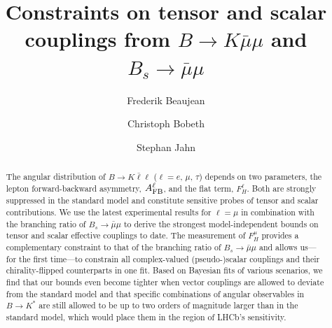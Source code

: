 \documentclass[twocolumn,epjc3]{svjour3}
\numberwithin{equation}{section}
\renewcommand{\[}{\big[}
\renewcommand{\]}{\big]}
\renewcommand{\(}{\big(}
\renewcommand{\)}{\big)}
\begin{document}
\sloppy

\title{Constraints on tensor and scalar couplings from
  $B\to K\bar\mu\mu$ and $B_s\to \bar\mu\mu$
}
\author{Frederik Beaujean
  \and
  Christoph Bobeth
  \and
  Stephan Jahn
}


\maketitle

\begin{abstract}
  The angular distribution of $B\to K\bar\ell\ell$ ($\ell =
  e,\,\mu,\,\tau$) depends on two parameters, the lepton
  forward-backward asymmetry, $A_{\rm FB}^\ell$, and the flat term,
  $F_H^\ell$. Both are strongly suppressed in the standard model and
  constitute sensitive probes of tensor and scalar contributions. We
  use the latest experimental results for $\ell = \mu$ in combination
  with the branching ratio of $B_s\to \bar\mu\mu$ to derive the
  strongest model-independent bounds on tensor and scalar effective
  couplings to date. The measurement of $F_H^\mu$ provides a
  complementary constraint to that of the branching ratio of $B_s\to
  \bar\mu\mu$ and allows us---for the first time---to constrain all
  complex-valued (pseudo-)scalar couplings and their chirality-flipped
  counterparts in one fit. Based on Bayesian fits of various
  scenarios, we find that our bounds even become tighter when vector
  couplings are allowed to deviate from the standard model and that
  specific combinations of angular observables in $B \to K^*$ are
  still allowed to be up to two orders of magnitude larger than in the
  standard model, which would place them in the region of LHCb's
  sensitivity.
\end{abstract}
\end{document}
